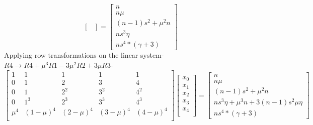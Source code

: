 \documentclass[12pt, oneside]{article}
\begin{document}
\begin{enumerate}
\[\begin{bmatrix}
\end{bmatrix}
= \begin{bmatrix}
n \\
n\mu \\
(n-1)s^2 + \mu^2n \\
ns^3 \eta \\
ns^4*(\gamma+3)
\end{bmatrix}
\]
Applying row transformations on the linear system- $R4 \to R4 + \mu^3 R1 - 3\mu^2 R2 + 3\mu R3$-
\[
\begin{bmatrix}
1 & 1 & 1 & 1 & 1 \\
0 & 1 & 2 & 3 & 4 \\
0 & 1 & 2^2 & 3^2 & 4^2 \\
0 & 1^3 & 2^3 & 3^3 & 4^3 \\
\mu^4 & (1-\mu)^4 & (2-\mu)^4 & (3-\mu)^4 & (4-\mu)^4 \\
\end{bmatrix}
\begin{bmatrix}
x_0 \\
x_1 \\
x_2 \\
x_3 \\
x_4 \\
\end{bmatrix}
= \begin{bmatrix}
n \\
n\mu \\
(n-1)s^2 + \mu^2n \\
ns^3\eta + \mu^3 n + 3(n-1)s^2\mu \eta \\
ns^4*(\gamma+3)
\end{bmatrix}
\]


\end{enumerate}
\end{document}
